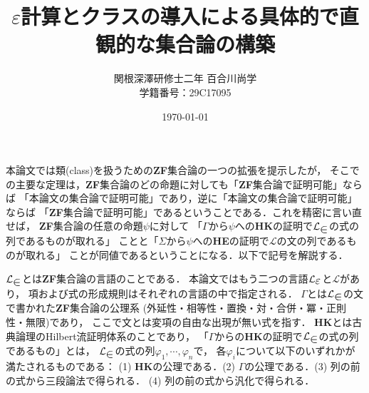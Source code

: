 \documentclass[twocolumn,10pt]{jsarticle}
\title{\vspace{-3cm}$\varepsilon$計算とクラスの導入による具体的で直観的な集合論の構築}
\author{関根深澤研修士二年 百合川尚学 \\ 学籍番号：29C17095}
\date{\today}
\theoremstyle{mystyle}
\newcommand{\lang}[1]{\mathcal{L}_{\scalebox{1.2}{$#1$}}} %
\begin{document}
\maketitle
	本論文では類(class)を扱うための{\bf ZF}集合論の一つの拡張を提示したが，
	そこでの主要な定理は，{\bf ZF}集合論のどの命題に対しても「{\bf ZF}集合論で証明可能」ならば
	「本論文の集合論で証明可能」であり，逆に「本論文の集合論で証明可能」ならば
	「{\bf ZF}集合論で証明可能」であるということである．これを精密に言い直せば，
	{\bf ZF}集合論の任意の命題$\psi$に対して
	「$\Gamma$から$\psi$への{\bf HK}の証明で$\lang{\in}$の式の列であるものが取れる」
	ことと「$\Sigma$から$\psi$への{\bf HE}の証明で$\mathcal{L}$の文の列であるものが取れる」
	ことが同値であるということになる．以下で記号を解説する．
	
	$\lang{\in}$とは{\bf ZF}集合論の言語のことである．
	本論文ではもう二つの言語$\lang{\varepsilon}$と$\mathcal{L}$があり，
	項および式の形成規則はそれぞれの言語の中で指定される．
	$\Gamma$とは$\lang{\in}$の文で書かれた{\bf ZF}集合論の公理系
	(外延性・相等性・置換・対・合併・冪・正則性・無限)であり，
	ここで文とは変項の自由な出現が無い式を指す．
	{\bf HK}とは古典論理のHilbert流証明体系のことであり，
	「$\Gamma$からの{\bf HK}の証明で$\lang{\in}$の式の列であるもの」とは，
	$\lang{\in}$の式の列$\varphi_{1},\cdots,\varphi_{n}$で，
	各$\varphi_{i}$について以下のいずれかが満たされるものである：
	(1) {\bf HK}の公理である．(2) $\Gamma$の公理である．(3) 列の前の式から三段論法で得られる．
	(4) 列の前の式から汎化で得られる．
	
\end{document}
